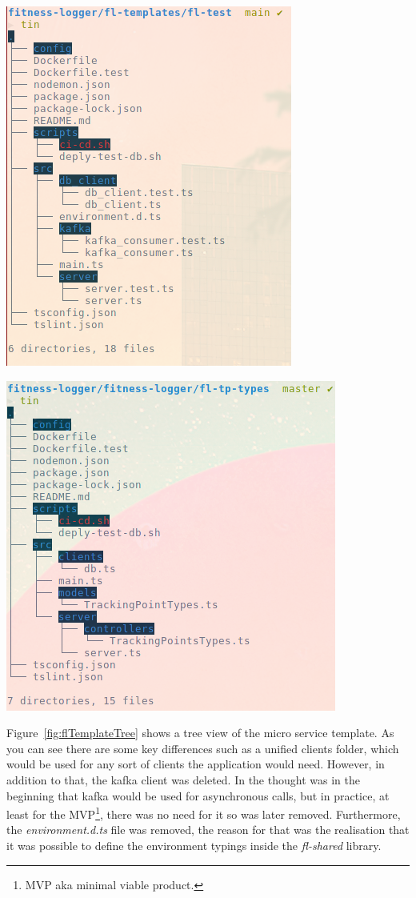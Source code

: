 \documentclass{article}
\begin{document}
\begin{multicols}{2}
\begingroup
\centering
\includegraphics[width=0.5\linewidth]{./appendix/assets/img/flTemplateTree.png}
~\label{fig:flTemplateTree}
\endgroup

\begingroup
\centering
\includegraphics[width=0.5\linewidth]{./appendix/assets/img/flTpTypesTree.png}
~\label{fig:flTpTypesTree}
\endgroup

Figure~\ref{fig:flTemplateTree} shows a tree view of the micro service template. As you can see there are some key differences such as a unified clients folder, which would be used for any sort of clients the application would need. However, in addition to that, the kafka client was deleted. In the thought was in the beginning that kafka would be used for asynchronous calls, but in practice, at least for the MVP\footnote{MVP aka minimal viable product.}, there was no need for it so was later removed. Furthermore, the \textit{environment.d.ts} file was removed, the reason for that was the realisation that it was possible to define the environment typings inside the \textit{fl-shared} library.\\


\end{multicols}
\end{document}
